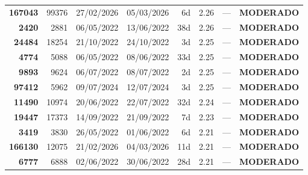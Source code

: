\documentclass[a4paper,10pt]{article}
\begin{document}
\begin{center}
\begin{longtable}{>{\scriptsize}r>{\scriptsize}r>{\scriptsize}c>{\scriptsize}c>{\scriptsize}r>{\scriptsize}r>{\scriptsize}r>{\scriptsize}l}
\textcolor{anomyellow}{\textbf{167043}} & 99376 & 27/02/2026 & 05/03/2026 & 6d & \textcolor{anomyellow}{2.26} & --- & \textcolor{anomyellow}{\textbf{MODERADO}} \\

\textcolor{anomyellow}{\textbf{2420}} & 2881 & 06/05/2022 & 13/06/2022 & 38d & \textcolor{anomyellow}{2.26} & --- & \textcolor{anomyellow}{\textbf{MODERADO}} \\

\textcolor{anomyellow}{\textbf{24484}} & 18254 & 21/10/2022 & 24/10/2022 & 3d & \textcolor{anomyellow}{2.25} & --- & \textcolor{anomyellow}{\textbf{MODERADO}} \\

\textcolor{anomyellow}{\textbf{4774}} & 5088 & 06/05/2022 & 08/06/2022 & 33d & \textcolor{anomyellow}{2.25} & --- & \textcolor{anomyellow}{\textbf{MODERADO}} \\

\textcolor{anomyellow}{\textbf{9893}} & 9624 & 06/07/2022 & 08/07/2022 & 2d & \textcolor{anomyellow}{2.25} & --- & \textcolor{anomyellow}{\textbf{MODERADO}} \\

\textcolor{anomyellow}{\textbf{97412}} & 5962 & 09/07/2024 & 12/07/2024 & 3d & \textcolor{anomyellow}{2.25} & --- & \textcolor{anomyellow}{\textbf{MODERADO}} \\

\textcolor{anomyellow}{\textbf{11490}} & 10974 & 20/06/2022 & 22/07/2022 & 32d & \textcolor{anomyellow}{2.24} & --- & \textcolor{anomyellow}{\textbf{MODERADO}} \\

\textcolor{anomyellow}{\textbf{19447}} & 17373 & 14/09/2022 & 21/09/2022 & 7d & \textcolor{anomyellow}{2.23} & --- & \textcolor{anomyellow}{\textbf{MODERADO}} \\

\textcolor{anomyellow}{\textbf{3419}} & 3830 & 26/05/2022 & 01/06/2022 & 6d & \textcolor{anomyellow}{2.21} & --- & \textcolor{anomyellow}{\textbf{MODERADO}} \\

\textcolor{anomyellow}{\textbf{166130}} & 12075 & 21/02/2026 & 04/03/2026 & 11d & \textcolor{anomyellow}{2.21} & --- & \textcolor{anomyellow}{\textbf{MODERADO}} \\

\textcolor{anomyellow}{\textbf{6777}} & 6888 & 02/06/2022 & 30/06/2022 & 28d & \textcolor{anomyellow}{2.21} & --- & \textcolor{anomyellow}{\textbf{MODERADO}} \\


\end{longtable}
\end{center}
\end{document}
